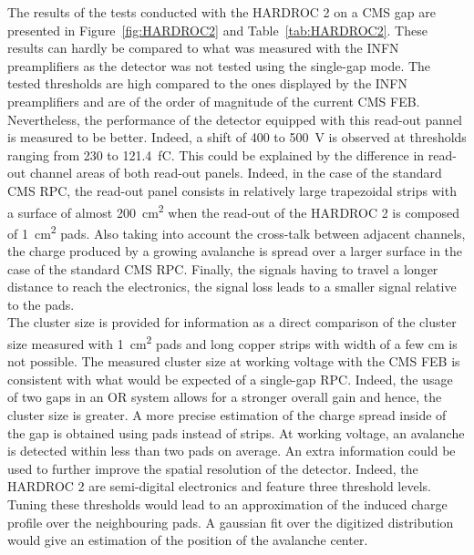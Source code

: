 	The results of the tests conducted with the HARDROC 2 on a CMS gap are presented in Figure~\ref{fig:HARDROC2} and Table~\ref{tab:HARDROC2}. These results can hardly be compared to what was measured with the INFN preamplifiers as the detector was not tested using the single-gap mode. The tested thresholds are high compared to the ones displayed by the INFN preamplifiers and are of the order of magnitude of the current CMS FEB. Nevertheless, the performance of the detector equipped with this read-out pannel is measured to be better. Indeed, a shift of 400 to \SI{500}{V} is observed at thresholds ranging from 230 to \SI{121.4}{fC}. This could be explained by the difference in read-out channel areas of both read-out panels. Indeed, in the case of the standard CMS RPC, the read-out panel consists in relatively large trapezoidal strips with a surface of almost \SI{200}{cm^2} when the read-out of the HARDROC 2 is composed of \SI{1}{cm^2} pads. Also taking into account the cross-talk between adjacent channels, the charge produced by a growing avalanche is spread over a larger surface in the case of the standard CMS RPC. Finally, the signals having to travel a longer distance to reach the electronics, the signal loss leads to a smaller signal relative to the pads.\\
	The cluster size is provided for information as a direct comparison of the cluster size measured with \SI{1}{cm^2} pads and long copper strips with width of a few \si{cm} is not possible. The measured cluster size at working voltage with the CMS FEB is consistent with what would be expected of a single-gap RPC. Indeed, the usage of two gaps in an OR system allows for a stronger overall gain and hence, the cluster size is greater. A more precise estimation of the charge spread inside of the gap is obtained using pads instead of strips. At working voltage, an avalanche is detected within less than two pads on average. An extra information could be used to further improve the spatial resolution of the detector. Indeed, the HARDROC 2 are semi-digital electronics and feature three threshold levels. Tuning these thresholds would lead to an approximation of the induced charge profile over the neighbouring pads. A gaussian fit over the digitized distribution would give an estimation of the position of the avalanche center.
	

